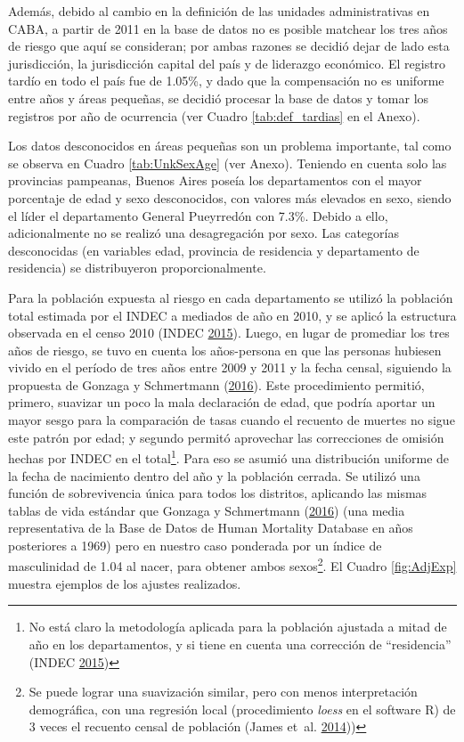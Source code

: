 \documentclass[12pt,spanish,]{article}
\begin{document}
Además, debido al cambio en la definición de las unidades
administrativas en CABA, a partir de 2011 en la base de datos no es
posible matchear los tres años de riesgo que aquí se consideran; por
ambas razones se decidió dejar de lado esta jurisdicción, la
jurisdicción capital del país y de liderazgo económico. El registro
tardío en todo el país fue de 1.05\%, y dado que la compensación no es
uniforme entre años y áreas pequeñas, se decidió procesar la base de
datos y tomar los registros por año de ocurrencia (ver Cuadro
\ref{tab:def_tardias} en el Anexo).

Los datos desconocidos en áreas pequeñas son un problema importante, tal
como se observa en Cuadro \ref{tab:UnkSexAge} (ver Anexo). Teniendo en
cuenta solo las provincias pampeanas, Buenos Aires poseía los
departamentos con el mayor porcentaje de edad y sexo desconocidos, con
valores más elevados en sexo, siendo el líder el departamento General
Pueyrredón con 7.3\%. Debido a ello, adicionalmente no se realizó una
desagregación por sexo. Las categorías desconocidas (en variables edad,
provincia de residencia y departamento de residencia) se distribuyeron
proporcionalmente.

Para la población expuesta al riesgo en cada departamento se utilizó la
población total estimada por el INDEC a mediados de año en 2010, y se
aplicó la estructura observada en el censo 2010 (INDEC
\protect\hyperlink{ref-INDEC2015}{2015}). Luego, en lugar de promediar
los tres años de riesgo, se tuvo en cuenta los años-persona en que las
personas hubiesen vivido en el período de tres años entre 2009 y 2011 y
la fecha censal, siguiendo la propuesta de Gonzaga y Schmertmann
(\protect\hyperlink{ref-Gonzaga_Schmertmann_2016}{2016}). Este
procedimiento permitió, primero, suavizar un poco la mala declaración de
edad, que podría aportar un mayor sesgo para la comparación de tasas
cuando el recuento de muertes no sigue este patrón por edad; y segundo
permitó aprovechar las correcciones de omisión hechas por INDEC en el
total\footnote{No está claro la metodología aplicada para la población
  ajustada a mitad de año en los departamentos, y si tiene en cuenta una
  corrección de ``residencia'' (INDEC
  \protect\hyperlink{ref-INDEC2015}{2015})}. Para eso se asumió una
distribución uniforme de la fecha de nacimiento dentro del año y la
población cerrada. Se utilizó una función de sobrevivencia única para
todos los distritos, aplicando las mismas tablas de vida estándar que
Gonzaga y Schmertmann
(\protect\hyperlink{ref-Gonzaga_Schmertmann_2016}{2016}) (una media
representativa de la Base de Datos de Human Mortality Database en años
posteriores a 1969) pero en nuestro caso ponderada por un índice de
masculinidad de 1.04 al nacer, para obtener ambos sexos\footnote{Se
  puede lograr una suavización similar, pero con menos interpretación
  demográfica, con una regresión local (procedimiento \emph{loess} en el
  software R) de 3 veces el recuento censal de población (James et~al.
  \protect\hyperlink{ref-James2014}{2014}))}. El Cuadro \ref{fig:AdjExp}
muestra ejemplos de los ajustes realizados.
\end{document}

